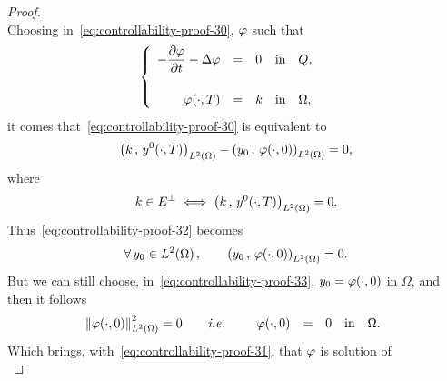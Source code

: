 \begin{proof}
\begin{equation}
    \end{equation}
    Choosing in~\eqref{eq:controllability-proof-30}, $\varphi$ such that
    \begin{equation}\label{eq:controllability-proof-31}
        \begin{cases}\displaystyle
            \begin{array}{rclll}
                -\dfrac{\partial{}\varphi}{\partial{}t} - \Delta\varphi & = & 0 & \text{in} & Q,\\
                \\
                \varphi\!\left({\cdot,T}\right) & = & k & \text{in} &
                \Omega,
            \end{array}
        \end{cases}
    \end{equation}
    it comes that~\eqref{eq:controllability-proof-30} is equivalent to
    \begin{equation}\label{eq:controllability-proof-32}
        \scalaireohm{k}{y^{0}\!\left({\cdot,T}\right)} - \scalaireohm{%
            y_{0}
        }{%
            \vphi\!\left({\cdot,0}\right)
        } = 0,
    \end{equation}
    where
    \begin{equation*}
        k\in E^{\perp}\iff {\left({ k\,,\,y^{0}\!\left({\cdot,T}\right) }\right)}_{L^{2}\left({\Omega}\right)} =
        0.
    \end{equation*}
    Thus~\eqref{eq:controllability-proof-32} becomes
    \begin{equation}\label{eq:controllability-proof-33}
        \forall\,y_{0}\in\Ldeux{\Omega},\qquad \scalaireohm{y_{0}}{%
            \vphi\!\left({\cdot,0}\right)
        } = 0.
    \end{equation}
    But we can still choose, in~\eqref{eq:controllability-proof-33},
    $\displaystyle y_{0} = \varphi\!\left({\cdot,0}\right)$ in $\Omega$, and
    then it follows
    \begin{equation*}
        {\left\|{\varphi\!\left({\cdot,0}\right) }\right\|}_{L^{2}\left({\Omega}\right)}^{2} = 0\qquad\textit{i.e.}\qquad
        \begin{array}{rclll}
            \varphi\!\left({\cdot,0}\right) & = & 0 & \text{in} & \Omega.
        \end{array}
    \end{equation*}
    Which brings, with~\eqref{eq:controllability-proof-31}, that $\varphi$ is
    solution of
    \begin{equation*}

\end{equation*}
\end{proof}
